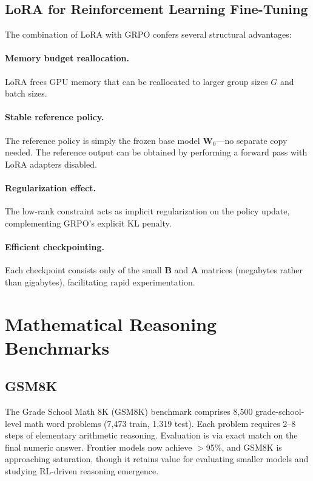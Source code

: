 \documentclass[12pt,a4paper]{report}
\begin{document}
\subsection{LoRA for Reinforcement Learning Fine-Tuning}

The combination of LoRA with GRPO confers several structural advantages:

\paragraph{Memory budget reallocation.} LoRA frees GPU memory that can be reallocated to larger group sizes $G$ and batch sizes.

\paragraph{Stable reference policy.} The reference policy is simply the frozen base model $\mathbf{W}_0$---no separate copy needed. The reference output can be obtained by performing a forward pass with LoRA adapters disabled.

\paragraph{Regularization effect.} The low-rank constraint acts as implicit regularization on the policy update, complementing GRPO's explicit KL penalty.

\paragraph{Efficient checkpointing.} Each checkpoint consists only of the small $\mathbf{B}$ and $\mathbf{A}$ matrices (megabytes rather than gigabytes), facilitating rapid experimentation.


\section{Mathematical Reasoning Benchmarks}
\label{sec:math-benchmarks}

\subsection{GSM8K}

The Grade School Math 8K (GSM8K) benchmark \cite{cobbe2021gsm8k} comprises 8,500 grade-school-level math word problems (7,473 train, 1,319 test). Each problem requires 2--8 steps of elementary arithmetic reasoning. Evaluation is via exact match on the final numeric answer. Frontier models now achieve $>$95\%, and GSM8K is approaching saturation, though it retains value for evaluating smaller models and studying RL-driven reasoning emergence.
\end{document}
